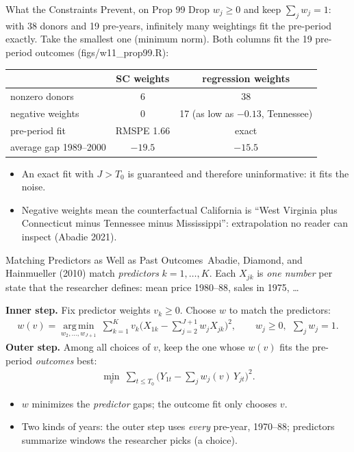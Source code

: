 \documentclass[aspectratio=169,11pt,xcolor=dvipsnames]{beamer}
\newcommand{\srcp}[1]{{\scriptsize\color{gray}(#1)}}
\newcommand{\srct}[1]{#1}
\DeclareMathOperator*{\argminop}{arg\,min}
\newcommand{\argmin}{\argminop\limits}
\newcommand{\core}{\,\raisebox{0.6pt}{\textcolor{corestar}{$\bigstar$}}}
\begin{document}
\begin{frame}{What the Constraints Prevent, on Prop 99}
Drop $w_j \geq 0$ and keep $\sum_j w_j = 1$: with 38 donors and 19 pre-years,
infinitely many weightings fit the pre-period exactly. Take the smallest one
(minimum norm). Both columns fit the 19 pre-period outcomes \srcp{figs/w11\_prop99.R}:
\vskip4pt
\begin{center}\small
\renewcommand{\arraystretch}{1.12}
\begin{tabular}{@{}lcc@{}}
\toprule
 & SC weights & regression weights \\
\midrule
nonzero donors & 6 & 38 \\
negative weights & 0 & 17 (as low as $-0.13$, Tennessee) \\
pre-period fit & RMSPE 1.66 & exact \\
average gap 1989--2000 & $-19.5$ & $-15.5$ \\
\bottomrule
\end{tabular}
\end{center}
\vskip4pt
\begin{itemize}\itemsep2pt
  \item An exact fit with $J > T_0$ is guaranteed and therefore uninformative: it
        fits the noise.
  \item Negative weights mean the counterfactual California is ``West Virginia
        plus Connecticut minus Tennessee minus Mississippi'': extrapolation no
        reader can inspect \srcp{Abadie 2021}.
\end{itemize}
\end{frame}

\begin{frame}{Matching Predictors as Well as Past Outcomes\core}
\srct{Abadie, Diamond, and Hainmueller (2010)} match \emph{predictors}
$k = 1,\dots,K$. Each $X_{jk}$ is \emph{one number} per state that the researcher
defines: mean price 1980--88, sales in 1975, \dots\par\vskip3pt
\textbf{Inner step.} Fix predictor weights $v_k \geq 0$. Choose $w$ to match the
predictors:
\begin{align*}
  w(v) = \argmin_{w_2,\dots,w_{J+1}}\ \textstyle\sum_{k=1}^{K} v_k\big(X_{1k} - \sum_{j=2}^{J+1} w_j X_{jk}\big)^2,
  \qquad w_j \geq 0,\ \ \textstyle\sum_j w_j = 1 .
\end{align*}
\textbf{Outer step.} Among all choices of $v$, keep the one whose $w(v)$ fits the
pre-period \emph{outcomes} best:
\begin{align*}
  \min_{v}\ \textstyle\sum_{t \leq T_0}\big(Y_{1t} - \sum_{j} w_j(v)\, Y_{jt}\big)^2 .
\end{align*}
\begin{itemize}\itemsep2pt
  \item $w$ minimizes the \emph{predictor} gaps; the outcome fit only chooses $v$.
  \item Two kinds of years: the outer step uses \emph{every} pre-year, 1970--88;
        predictors summarize windows the researcher picks (\alert{a choice}).
\end{itemize}
\end{frame}
\end{document}
